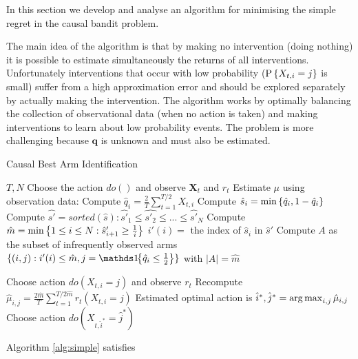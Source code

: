 In this section we develop and analyse an algorithm for minimising the simple regret in the
causal bandit problem.  


The main idea of the algorithm is that by making no intervention (doing nothing) it is possible to estimate simultaneously the returns of all interventions.
Unfortunately interventions that occur with low probability ($\P{X_{t,i} = j}$ is small) suffer from a high approximation error and should be
explored separately by actually making the intervention. The algorithm works by optimally balancing the collection of observational data (when
no action is taken) and making interventions to learn about low probability events. The problem is more challenging because $\boldsymbol{q}$ is
unknown and must also be estimated.

\begin{algorithm}[h]
\caption{Causal Best Arm Identification}\label{alg:simple}
\begin{algorithmic}[1]
 $T, N$
\STATE Choose the action $do()$ and observe $\boldsymbol{X}_t$ and $r_t$
\ENDFOR
\STATE Estimate $\mu$ using observation data:
\STATE Compute $\hat q_i = \frac{2}{T} \sum_{t=1}^{T/2} X_{t,i}$
\STATE Compute $\hat s_i = \min\set{\hat q_i, 1 - \hat q_i}$
\STATE Compute $\hat{s'} = sorted(\hat{s}) : \hat{s'}_1 \leq \hat{s'_2} \leq ... \leq \hat{s'}_N$
\STATE Compute $\hat m = \min\set{1 \leq i \leq N : \hat s'_{i+1} \geq \frac{1}{i}}$
\STATE $i'(i) = $ the index of $\hat s_i$ in $\hat s'$
\STATE Compute $A$ as the subset of infrequently observed arms $\{(i,j):i'(i) \leq \hat m, j = \ind{\hat q_{i} \leq \frac{1}{2}} \}$ with $|A| = \hat m$

\STATE Choose action $do(X_{t,i} = j)$ and observe $r_t$
\ENDFOR
\STATE Recompute $\hat \mu_{i,j} = \frac{2\hat m}{T} \sum_{t=1}^{ T/2\hat m} r_t(X_{t,i}=j)$ 
\ENDFOR
\STATE Estimated optimal action is $\hat i^*, \hat j^* = \argmax_{i,j} \hat \mu_{i,j}$
\STATE Choose action $do(X_{t,\hat i^*} = \hat j^*)$
\end{algorithmic}
\end{algorithm}



\begin{theorem}\label{thm:uq-simple}
Algorithm \ref{alg:simple} satisfies
\end{theorem}

